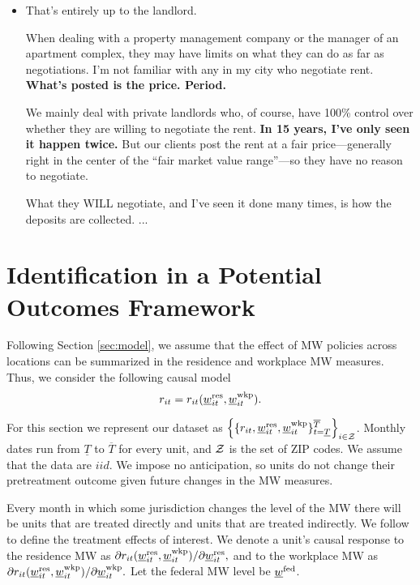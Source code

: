 \begin{itemize} \itshape
	\item 
	That's entirely up to the landlord.

	When dealing with a property management company or the manager of an
	apartment complex, they may have limits on what they can do as far as
	negotiations. I'm not familiar with any in my city who negotiate rent.
	\textbf{What's posted is the price. Period.}
	
	We mainly deal with private landlords who, of course, have 100\% control 
	over whether they are willing to negotiate the rent.
	\textbf{In 15 years, I've only seen it happen twice.}
	But our clients post the rent at a fair price—generally right in the 
	center of the ``fair market value range''—so they have no reason to 
	negotiate.

	What they WILL negotiate, and I've seen it done many times, is how the 
	deposits are collected. ...
\end{itemize}

\clearpage
\section{Identification in a Potential Outcomes Framework}
\label{sec:potential_outcomes}

Following Section \ref{sec:model}, we assume that the effect of MW policies 
across locations can be summarized in the residence and workplace MW measures.
Thus, we consider the following causal model
\begin{equation}\label{eq:causal_model}
    r_{it} = r_{it}(\underline{w}_{it}^{\text{res}}, \underline{w}_{it}^{\text{wkp}}) .
\end{equation}

For this section we represent our dataset as
$\left\{\{r_{it}, \underline{w}^{\text{res}}_{it}, \underline{w}^{\text{wkp}}_{it}\}
       _{t=\underline{T}}^{\overline{T}}\right\}_{i\in\mathcal{Z}}$.
Monthly dates run from $\underline{T}$ to $\overline{T}$ for every unit,
and $\mathcal{Z}$ is the set of ZIP codes.
We assume that the data are $iid$.
We impose no anticipation, so units do not change their pretreatment outcome 
given future changes in the MW measures.

Every month in which some jurisdiction changes the level of the MW there will 
be units that are treated directly and units that are treated indirectly.
We follow \textcite{AngristImbens1995, CallawayEtAl2021} to define the 
treatment effects of interest.
We denote a unit's causal response to the residence MW as
$\partial r_{it}(\underline{w}_{it}^{\text{res}}, \underline{w}_{it}^{\text{wkp}})/\partial \underline{w}_{it}^{\text{res}} ,$
and to the workplace MW as 
$\partial r_{it}(\underline{w}_{it}^{\text{res}}, \underline{w}_{it}^{\text{wkp}})/\partial \underline{w}_{it}^{\text{wkp}} .$
Let the federal MW level be $\underline{w}^{\text{fed}}$.

